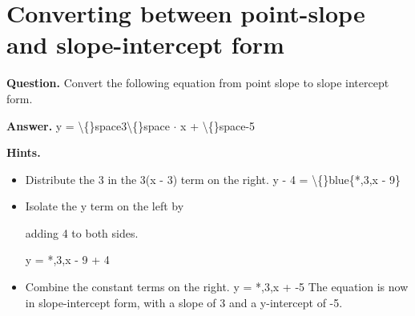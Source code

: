 \documentclass{article}
\begin{document}
\section*{Converting between point-slope and slope-intercept form}
\textbf{Question.} Convert the following equation from point slope to slope intercept form.

\textbf{Answer.} y = \textbackslash\{\}space3\textbackslash\{\}space $\cdot$ x + \textbackslash\{\}space-5

\textbf{Hints.}
\begin{itemize}
  \item Distribute the 3 in the 3(x - 3) term on the right.
                    y - 4 = \textbackslash\{\}blue\{*,3,x - 9\}
  \item Isolate the y term on the left by
                        
                        adding 4 to both sides.
                    
                    y = *,3,x - 9 + 4
  \item Combine the constant terms on the right.
                    y = *,3,x + -5
                    The equation is now in slope-intercept form, with a slope of 3 and a y-intercept of -5.
\end{itemize}
\end{document}
